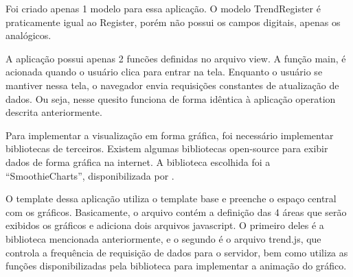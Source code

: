 	Foi criado apenas 1 modelo para essa aplicação. O modelo TrendRegister é praticamente igual ao Register, porém não possui os campos digitais, apenas os analógicos. 
	
	A aplicação possui apenas 2 funcões definidas no arquivo view. A função main, é acionada quando o usuário clica para entrar na tela. Enquanto o usuário se mantiver nessa tela, o navegador envia requisições constantes de atualização de dados. Ou seja, nesse quesito funciona de forma idêntica à aplicação operation descrita anteriormente.
	
	Para implementar a visualização em forma gráfica, foi necessário implementar bibliotecas de terceiros. Existem algumas bibliotecas open-source para exibir dados de forma gráfica na internet. A biblioteca escolhida foi a ``SmoothieCharts'', disponibilizada por \textcite{walnes2017}.
	
	O template dessa aplicação utiliza o template base e preenche o espaço central com os gráficos. Basicamente, o arquivo contém a definição das 4 áreas que serão exibidos os gráficos e adiciona dois arquivos javascript. O primeiro deles é a biblioteca mencionada anteriormente, e o segundo é o arquivo trend.js, que controla a frequência de requisição de dados para o servidor, bem como utiliza as funções disponibilizadas pela biblioteca para implementar a animação do gráfico.
		